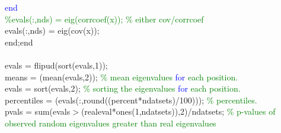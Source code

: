 \hspace{1mm}\indent \indent \indent \indent \indent \indent \indent \indent \indent \indent \indent \textcolor{blue}{end} \\ 
\hspace{1mm}\indent \indent \indent \indent \indent \indent \indent \indent \indent \indent \indent \textcolor{green}{\%evals(:,nds) = eig(corrcoef(x));   }\textcolor{green}{\% either cov/corrcoef }\\ 
\hspace{1mm}\indent \indent \indent \indent \indent \indent \indent \indent \indent \indent \indent evals(:,nds) = eig(cov(x)); \\ 
\hspace{1mm}\indent \indent \indent \indent \indent \indent \indent \indent \indent \indent \indent end;end \\ 
\hspace{1mm}\indent \indent \indent \indent \indent \indent \indent \indent \indent \indent \indent  \\ 
\hspace{1mm}\indent \indent \indent \indent \indent \indent \indent \indent \indent \indent \indent evals = flipud(sort(evals,1)); \\ 
\hspace{1mm}\indent \indent \indent \indent \indent \indent \indent \indent \indent \indent \indent means = (mean(evals,2));   \textcolor{green}{\% mean eigenvalues \textcolor{blue}{for} each position. }\\ 
\hspace{1mm}\indent \indent \indent \indent \indent \indent \indent \indent \indent \indent \indent \indent evals = sort(evals,2);     \textcolor{green}{\% sorting the eigenvalues \textcolor{blue}{for} each position. }\\ 
\hspace{1mm}\indent \indent \indent \indent \indent \indent \indent \indent \indent \indent \indent \indent \indent percentiles = (evals(:,round((percent*ndatsets)/100)));  \textcolor{green}{\% percentiles. }\\ 
\hspace{1mm}\indent \indent \indent \indent \indent \indent \indent \indent \indent \indent \indent \indent \indent pvals = sum(evals$>$(realeval*ones(1,ndatsets)),2)/ndatsets; \textcolor{green}{\% p-values of observed random eigenvalues greater than real eigenvalues }\\ 
\hspace{1mm}\indent \indent \indent \indent \indent \indent \indent \indent \indent \indent \indent \indent \indent  \\ 
